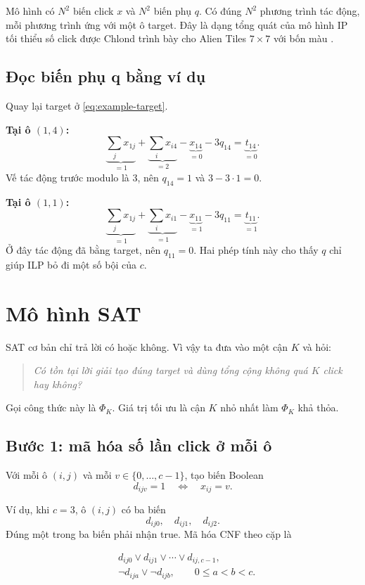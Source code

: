 \documentclass[11pt,a4paper]{article}
\begin{document}
Mô hình có $N^2$ biến click $x$ và $N^2$ biến phụ $q$. Có đúng $N^2$
phương trình tác động, mỗi phương trình ứng với một ô target. Đây là dạng
tổng quát của mô hình IP tối thiểu số click được Chlond trình bày cho Alien
Tiles $7\times7$ với bốn màu \cite{chlond2006alien}.

\subsection{Đọc biến phụ q bằng ví dụ}
Quay lại target ở \cref{eq:example-target}.

\textbf{Tại ô $(1,4)$:}
\[
\underbrace{\sum_jx_{1j}}_{=1}
+
\underbrace{\sum_ix_{i4}}_{=2}
-
\underbrace{x_{14}}_{=0}
-3q_{14}
=
\underbrace{t_{14}}_{=0}.
\]
Vế tác động trước modulo là 3, nên $q_{14}=1$ và $3-3\cdot1=0$.

\textbf{Tại ô $(1,1)$:}
\[
\underbrace{\sum_jx_{1j}}_{=1}
+
\underbrace{\sum_ix_{i1}}_{=1}
-
\underbrace{x_{11}}_{=1}
-3q_{11}
=
\underbrace{t_{11}}_{=1}.
\]
Ở đây tác động đã bằng target, nên $q_{11}=0$. Hai phép tính này cho thấy
$q$ chỉ giúp ILP bỏ đi một số bội của $c$.

\section{Mô hình SAT}\label{sec:sat}

SAT cơ bản chỉ trả lời có hoặc không. Vì vậy ta đưa vào một cận $K$ và hỏi:

\begin{quote}
\emph{Có tồn tại lời giải tạo đúng target và dùng tổng cộng không quá
$K$ click hay không?}
\end{quote}

Gọi công thức này là $\Phi_K$. Giá trị tối ưu là cận $K$ nhỏ nhất làm
$\Phi_K$ khả thỏa.

\subsection{Bước 1: mã hóa số lần click ở mỗi ô}

Với mỗi ô $(i,j)$ và mỗi $v\in\{0,\ldots,c-1\}$, tạo biến Boolean
\[
  d_{ijv}=1
  \quad\Longleftrightarrow\quad
  x_{ij}=v.
\]

Ví dụ, khi $c=3$, ô $(i,j)$ có ba biến
\[
  d_{ij0},\quad d_{ij1},\quad d_{ij2}.
\]
Đúng một trong ba biến phải nhận true. Mã hóa CNF theo cặp là

\begin{align}
  &d_{ij0}\lor d_{ij1}\lor\cdots\lor d_{ij,c-1},
  \label{eq:sat-atleast}\\
  &\lnot d_{ija}\lor\lnot d_{ijb},
  \qquad 0\le a<b<c.
  \label{eq:sat-atmost}
\end{align}
\end{document}
